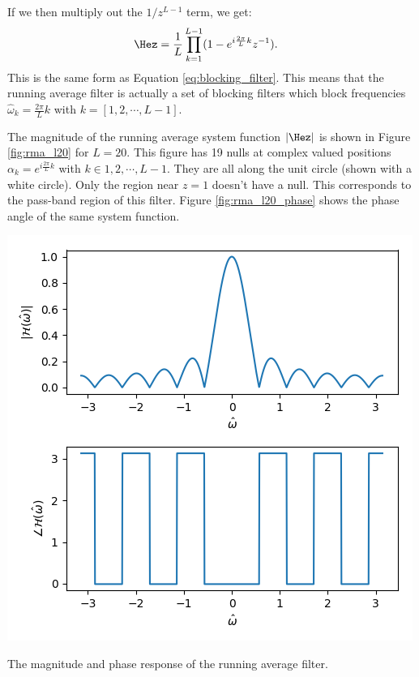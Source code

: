 If we then multiply out the $1/z^{L-1}$ term, we get:
\begin{align}
\Hez &= \frac{1}{L} \prod_{k=1}^{L-1}(1-e^{i\frac{2\pi}{L}k}z^{-1}).
\end{align}
This is the same form as Equation \ref{eq:blocking_filter}. This means
that the running average filter is actually a set of blocking filters
which block frequencies $\hat{\omega}_k=\frac{2\pi}{L}k$ with
$k=[1,2,\cdots,L-1]$. 

The magnitude of the running average system function $|\Hez|$ is shown
in Figure \ref{fig:rma_l20} for $L=20$. This figure has 19 nulls at
complex valued positions $\alpha_k=e^{i\frac{2\pi}{L}k}$ with $k\in
{1,2,\cdots,L-1}$. They are all along the unit circle (shown with a
white circle). Only the region near $z=1$ doesn't have a null. This
corresponds to the pass-band region of this filter. Figure
\ref{fig:rma_l20_phase} shows the phase angle of the same system
function.
\begin{marginfigure}[5cm]
\begin{center}
\includegraphics[width=\textwidth]{code/025_system_function/rma_magresp.png}
\end{center}
\caption{The magnitude and phase response of the running average filter.}
\label{fig:magresp}
\end{marginfigure}


